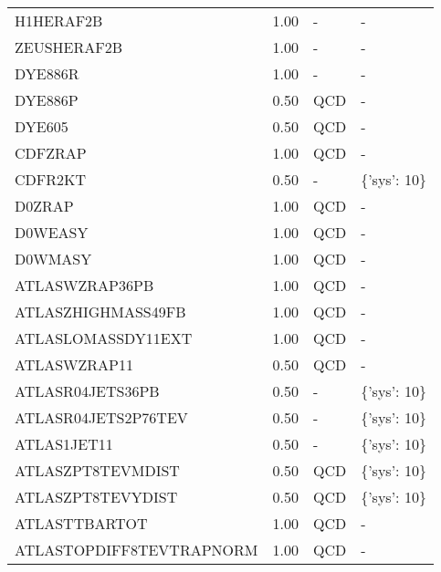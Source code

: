 \begin{center}
{\begin{tabular}{lrll}
        H1HERAF2B                &               1.00 &         - &            - \\
        ZEUSHERAF2B              &               1.00 &         - &            - \\
        DYE886R                  &               1.00 &         - &            - \\
        DYE886P                  &               0.50 &       QCD &            - \\
        DYE605                   &               0.50 &       QCD &            - \\
        CDFZRAP                  &               1.00 &       QCD &            - \\
        CDFR2KT                  &               0.50 &         - &  \{'sys': 10\} \\
        D0ZRAP                   &               1.00 &       QCD &            - \\
        D0WEASY                  &               1.00 &       QCD &            - \\
        D0WMASY                  &               1.00 &       QCD &            - \\
        ATLASWZRAP36PB           &               1.00 &       QCD &            - \\
        ATLASZHIGHMASS49FB       &               1.00 &       QCD &            - \\
        ATLASLOMASSDY11EXT       &               1.00 &       QCD &            - \\
        ATLASWZRAP11             &               0.50 &       QCD &            - \\
        ATLASR04JETS36PB         &               0.50 &         - &  \{'sys': 10\} \\
        ATLASR04JETS2P76TEV      &               0.50 &         - &  \{'sys': 10\} \\
        ATLAS1JET11              &               0.50 &         - &  \{'sys': 10\} \\
        ATLASZPT8TEVMDIST        &               0.50 &       QCD &  \{'sys': 10\} \\
        ATLASZPT8TEVYDIST        &               0.50 &       QCD &  \{'sys': 10\} \\
        ATLASTTBARTOT            &               1.00 &       QCD &            - \\
        ATLASTOPDIFF8TEVTRAPNORM &               1.00 &       QCD &            - \\

\end{tabular}}
\end{center}
